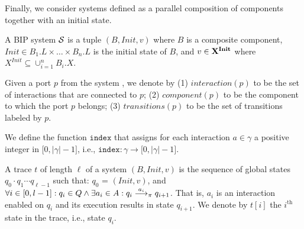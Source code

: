 Finally, we consider systems defined as a parallel composition of components together with an initial state.
%
\begin{definition}[System]
\label{def:system}
A BIP system ${\cal S}$ is a tuple $(B,\mathit{Init}, v)$ where $B$ is a composite component,  $\mathit{Init}\in B_1.L\times \ldots\times B_n.L$ is the initial state of $B$, and $v \in \valu{X^{Init}}$ where $X^{Init} \subseteq \cup_{i = 1} ^ { n } B_i.X$.
\end{definition}

Given a port $p$ from the system \Pm, we denote by (1) $interaction(p)$ to be the set of interactions that are connected to $p$; (2) $component(p)$ to be the component to which the port $p$ belongs; (3) $transitions(p)$ to be the set of transitions labeled by $p$. 

We define the function $\mathtt{index}$ that assigns for each interaction $a \in \gamma$ a positive integer in $\big[0,|\gamma| - 1\big]$, i.e., $\mathtt{index}: \gamma \rightarrow \big[0,|\gamma| - 1\big]$. 


\begin{definition}[Trace]
  A trace $t$ of length $\ell$ of a system $(B,\mathit{Init}, v)$ is the sequence of global states  
  $q_0 \cdot q_1 \cdots q_{\ell-1}$ 
  such that: $q_0$ = $(\mathit{Init}, v)$, and 
  $\forall i\in [0,l-1]: q_i\in Q \wedge \exists a_i\in A: q_i \goesto[a_i]_\pi q_{i+1}$.
%
%
That is, $a_i$ is an interaction enabled on $q_i$ and its execution results in state $q_{i+1}$. 
We denote by $t[i]$ the $i^{\text{th}}$ state in the trace, i.e., state $q_i$.
\end{definition}

